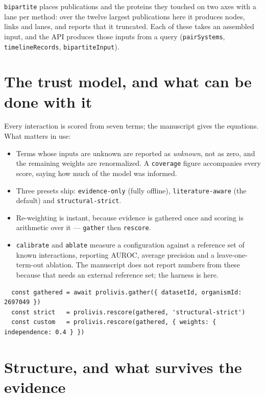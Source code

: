 \documentclass[11pt,a4paper]{article}
\begin{document}
\texttt{bipartite} places publications and the proteins they touched on two axes with a
lane per method: over the twelve largest publications here it produces
\SuppBipartiteNodes{} nodes, \SuppBipartiteLinks{} links and \SuppBipartiteLanes{}
lanes, and reports that it truncated. Each of these takes an assembled input, and the
API produces those inputs from a query (\texttt{pairSystems}, \texttt{timelineRecords},
\texttt{bipartiteInput}).

\clearpage
\section{The trust model, and what can be done with it}

Every interaction is scored from seven terms; the manuscript gives the equations. What
matters in use:

\begin{itemize}
  \item Terms whose inputs are unknown are reported as \emph{unknown}, not as zero, and
        the remaining weights are renormalized. A \texttt{coverage} figure accompanies
        every score, saying how much of the model was informed.
  \item Three presets ship: \texttt{evidence-only} (fully offline),
        \texttt{literature-aware} (the default) and \texttt{structural-strict}.
  \item Re-weighting is instant, because evidence is gathered once and scoring is
        arithmetic over it --- \texttt{gather} then \texttt{rescore}.
  \item \texttt{calibrate} and \texttt{ablate} measure a configuration against a
        reference set of known interactions, reporting AUROC, average precision and a
        leave-one-term-out ablation. The manuscript does not report numbers from these
        because that needs an external reference set; the harness is here.
\end{itemize}

\begin{verbatim}
  const gathered = await prolivis.gather({ datasetId, organismId: 2697049 })
  const strict   = prolivis.rescore(gathered, 'structural-strict')
  const custom   = prolivis.rescore(gathered, { weights: { independence: 0.4 } })
\end{verbatim}

\section{Structure, and what survives the evidence}
\end{document}
